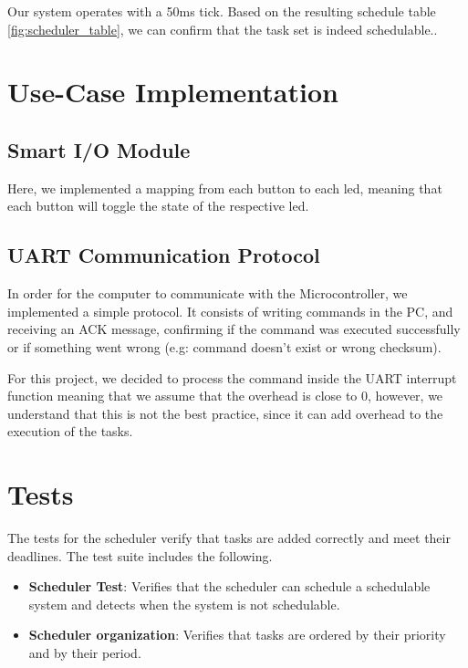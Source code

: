 \documentclass[a4paper,12pt]{article}
\begin{document}
Our system operates with a 50ms tick. Based on the resulting schedule table \ref{fig:scheduler_table}, we can confirm that the task set is indeed schedulable..


\section{Use-Case Implementation}
\subsection{Smart I/O Module}
Here, we implemented a mapping from each button to each led, meaning that each button will toggle the state of the respective led.

\subsection{UART Communication Protocol}
In order for the computer to communicate with the Microcontroller, we implemented a simple protocol. It consists of writing commands in the PC, and receiving an ACK message, confirming if the command was executed successfully or if something went wrong (e.g: command doesn't exist or wrong checksum).

For this project, we decided to process the command inside the UART interrupt function meaning that we assume that the overhead is close to 0, however, we understand that this is not the best practice, since it can add overhead to the execution of the tasks.

\section{Tests}
The tests for the scheduler verify that tasks are added correctly and meet their deadlines. 
The test suite includes the following.
\begin{itemize}
    \item \textbf{Scheduler Test}: Verifies that the scheduler can schedule a schedulable system and detects when the system is not schedulable.
    \item \textbf{Scheduler organization}: Verifies that tasks are ordered by their priority and by their period.
\end{itemize}
\end{document}
